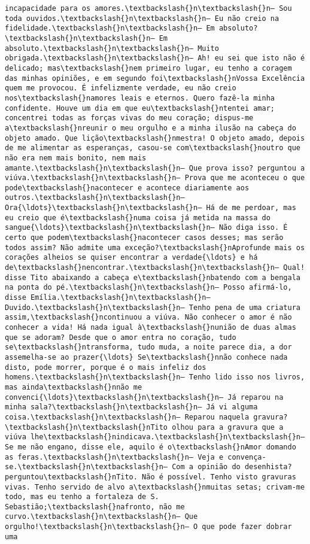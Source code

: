 \begin{Verbatim}[commandchars=\\\{\}]
incapacidade para os amores.\textbackslash{}n\textbackslash{}n— Sou toda ouvidos.\textbackslash{}n\textbackslash{}n— Eu não creio na fidelidade.\textbackslash{}n\textbackslash{}n— Em absoluto?\textbackslash{}n\textbackslash{}n— Em absoluto.\textbackslash{}n\textbackslash{}n— Muito obrigada.\textbackslash{}n\textbackslash{}n— Ah! eu sei que isto não é delicado; mas\textbackslash{}nem primeiro lugar, eu tenho a coragem das minhas opiniões, e em segundo foi\textbackslash{}nVossa Excelência quem me provocou. É infelizmente verdade, eu não creio nos\textbackslash{}namores leais e eternos. Quero fazê-la minha confidente. Houve um dia em que eu\textbackslash{}ntentei amar; concentrei todas as forças vivas do meu coração; dispus-me a\textbackslash{}nreunir o meu orgulho e a minha ilusão na cabeça do objeto amado. Que lição\textbackslash{}nmestra! O objeto amado, depois de me alimentar as esperanças, casou-se com\textbackslash{}noutro que não era nem mais bonito, nem mais amante.\textbackslash{}n\textbackslash{}n— Que prova isso? perguntou a viúva.\textbackslash{}n\textbackslash{}n— Prova que me aconteceu o que pode\textbackslash{}nacontecer e acontece diariamente aos outros.\textbackslash{}n\textbackslash{}n— Ora{\ldots}\textbackslash{}n\textbackslash{}n— Há de me perdoar, mas eu creio que é\textbackslash{}numa coisa já metida na massa do sangue{\ldots}\textbackslash{}n\textbackslash{}n— Não diga isso. É certo que podem\textbackslash{}nacontecer casos desses; mas serão todos assim? Não admite uma exceção?\textbackslash{}nAprofunde mais os corações alheios se quiser encontrar a verdade{\ldots} e há de\textbackslash{}nencontrar.\textbackslash{}n\textbackslash{}n— Qual! disse Tito abaixando a cabeça e\textbackslash{}nbatendo com a bengala na ponta do pé.\textbackslash{}n\textbackslash{}n— Posso afirmá-lo, disse Emília.\textbackslash{}n\textbackslash{}n— Duvido.\textbackslash{}n\textbackslash{}n— Tenho pena de uma criatura assim,\textbackslash{}ncontinuou a viúva. Não conhecer o amor é não conhecer a vida! Há nada igual à\textbackslash{}nunião de duas almas que se adoram? Desde que o amor entra no coração, tudo se\textbackslash{}ntransforma, tudo muda, a noite parece dia, a dor assemelha-se ao prazer{\ldots} Se\textbackslash{}nnão conhece nada disto, pode morrer, porque é o mais infeliz dos homens.\textbackslash{}n\textbackslash{}n— Tenho lido isso nos livros, mas ainda\textbackslash{}nnão me convenci{\ldots}\textbackslash{}n\textbackslash{}n— Já reparou na minha sala?\textbackslash{}n\textbackslash{}n— Já vi alguma coisa.\textbackslash{}n\textbackslash{}n— Reparou naquela gravura?\textbackslash{}n\textbackslash{}nTito olhou para a gravura que a viúva lhe\textbackslash{}nindicava.\textbackslash{}n\textbackslash{}n— Se me não engano, disse ele, aquilo é o\textbackslash{}nAmor domando as feras.\textbackslash{}n\textbackslash{}n— Veja e convença-se.\textbackslash{}n\textbackslash{}n— Com a opinião do desenhista? perguntou\textbackslash{}nTito. Não é possível. Tenho visto gravuras vivas. Tenho servido de alvo a\textbackslash{}nmuitas setas; crivam-me todo, mas eu tenho a fortaleza de S. Sebastião;\textbackslash{}nafronto, não me curvo.\textbackslash{}n\textbackslash{}n— Que orgulho!\textbackslash{}n\textbackslash{}n— O que pode fazer dobrar uma 
\end{Verbatim}
